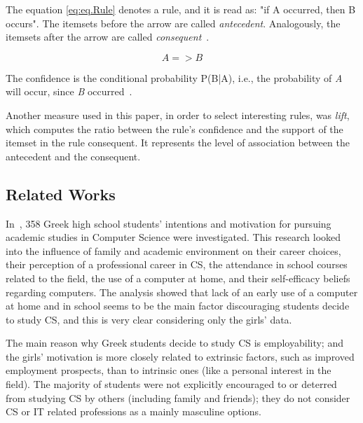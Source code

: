 The equation \ref{eq:eq.Rule} denotes a rule, and it is read as: "if A occurred, then B occurs". The itemsets before the arrow are called \emph{antecedent}. Analogously, the itemsets after the arrow are called \emph{consequent}~\cite{Hastie2009}.

\begin{equation}
{A} => {B}
\label{eq:eq.Rule}%
\end{equation}

The confidence is the conditional probability P(B|A), i.e., the probability of \emph{A} will occur, since \emph{B} occurred~\cite{Hastie2009}.

Another measure used in this paper, in order to select interesting rules, was \emph{lift}, which computes the ratio between the rule's confidence and the support of the itemset in the rule consequent. It represents the level of association between the antecedent and the consequent.~\cite{tan2006introduction}


%

\subsection{Related Works}\label{sec:background:related}%

In~\cite{papastergiou_are_2008}, 358 Greek high school students' intentions and motivation for pursuing academic studies in Computer Science were investigated. This research looked into the influence of family and academic environment on their career choices, their perception of a professional career in CS, the attendance in school courses related to the field, the use of a computer at home, and their self-efficacy beliefs regarding computers. The analysis showed that lack of an early use of a computer at home and in school seems to be the main factor discouraging students decide to study CS, and this is very clear considering only the girls' data.

The main reason why Greek students decide to study CS is employability; and the girls' motivation is more closely related to extrinsic factors, such as improved employment prospects, than to intrinsic ones (like a personal interest in the field). The majority of students were not explicitly encouraged to or deterred from studying CS by others (including family and friends); they do not consider CS or IT related professions as a mainly masculine options.

